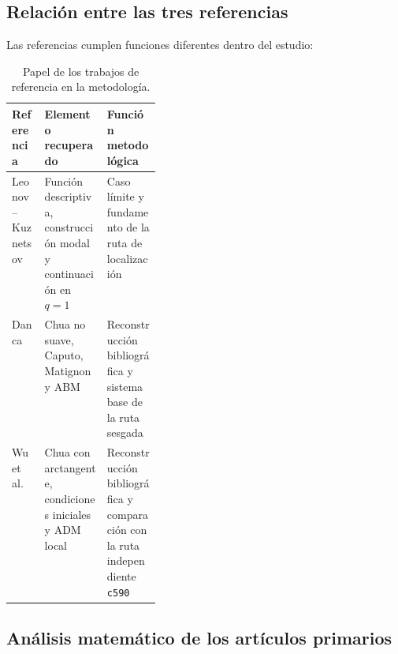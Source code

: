 \subsection{Relación entre las tres referencias}

Las referencias cumplen funciones diferentes dentro del estudio:

\begin{table}[H]
\centering
\caption{Papel de los trabajos de referencia en la metodología.}
\label{tab:papel_referencias}
\begin{tabularx}{\linewidth}{L{0.22\linewidth}Y Y}
\toprule
Referencia & Elemento recuperado & Función metodológica\\
\midrule
Leonov--Kuznetsov
& Función descriptiva, construcción modal y continuación en \(q=1\)
& Caso límite y fundamento de la ruta de localización\\
Danca
& Chua no suave, Caputo, Matignon y ABM
& Reconstrucción bibliográfica y sistema base de la ruta sesgada\\
Wu et al.
& Chua con arctangente, condiciones iniciales y ADM local
& Reconstrucción bibliográfica y comparación con la ruta independiente
\texttt{c590}\\
\bottomrule
\end{tabularx}
\end{table}

\subsection{Análisis matemático de los artículos primarios}

